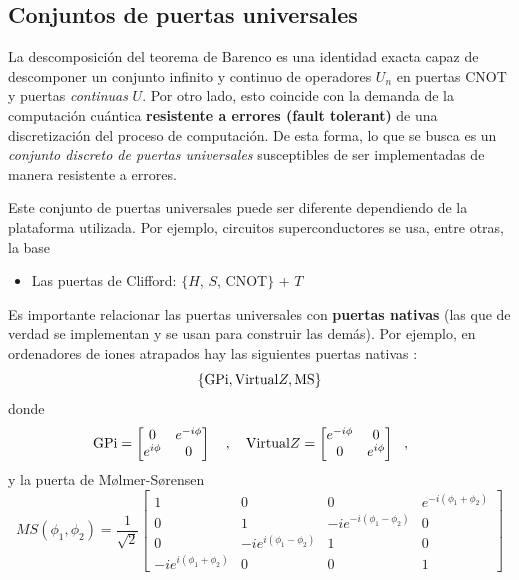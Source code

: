 \documentclass[a4paper,11pt]{book} %
\numberwithin{equation}{chapter}
\begin{document}
        \subsection{Conjuntos de puertas universales}

La descomposición del teorema de Barenco es  una identidad exacta capaz de descomponer un conjunto infinito y continuo de operadores $U_n$ en puertas CNOT y puertas \textit{continuas} $U$. Por otro lado, esto coincide con la demanda de la computación cuántica \textbf{resistente a errores (fault tolerant)} de una discretización del proceso de computación. De esta forma, lo que se busca es un \textit{conjunto discreto de puertas universales} susceptibles de ser implementadas de manera resistente a errores.

Este conjunto de puertas universales puede ser diferente dependiendo de la plataforma utilizada. Por ejemplo, circuitos superconductores se usa, entre otras, la base
	\begin{itemize}
		\item Las puertas de Clifford: $\{ H$, $S$, CNOT$ \}$ + $T$
	\end{itemize}

Es importante relacionar las puertas universales con \textbf{puertas nativas} (las que de verdad se implementan y se usan para construir las demás). Por ejemplo, en ordenadores de iones atrapados hay las siguientes puertas nativas \cite{bib_IONQ}:
\begin{equation}
\{ \hbox{GPi},\hbox{Virtual}Z, \hbox{MS}\} 
\end{equation}
donde 
\begin{equation}
\hbox{GPi} = \begin{bmatrix} 0 & e^{-i\phi} \\e^{i\phi} & 0 \end{bmatrix}~~~,~~~
\hbox{Virtual}Z = \begin{bmatrix} e^{-i\phi} & 0 \\ 0 & e^{i\phi} \end{bmatrix} ~~,~~~~
\end{equation}
y la puerta de Mølmer-Sørensen
\begin{equation}
MS(\phi_1,\phi_2) = \frac{1}{\sqrt{2}}
\begin{bmatrix}
1 & 0 & 0 & e^{-i(\phi_1+\phi_2)} \\ 0 & 1 &-i e^{-i(\phi_1-\phi_2)} & 0 \\ 0 & -i e^{i(\phi_1-\phi_2)} & 1 & 0  \\ 
-ie^{i(\phi_1+\phi_2)} & 0 & 0 & 1 
\end{bmatrix}
\end{equation}
\end{document}
